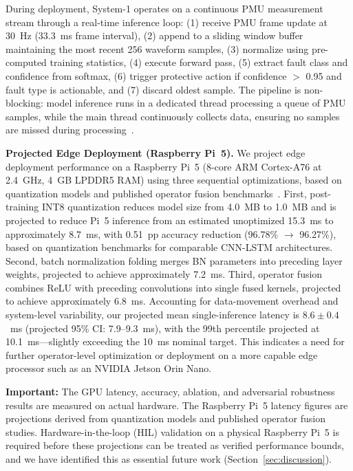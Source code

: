 \documentclass[journal]{IEEEtran}
\begin{document}
During deployment, System-1 operates on a continuous PMU measurement stream through a real-time inference loop: (1) receive PMU frame update at 30~Hz (33.3~ms frame interval), (2) append to a sliding window buffer maintaining the most recent 256 waveform samples, (3) normalize using pre-computed training statistics, (4) execute forward pass, (5) extract fault class and confidence from softmax, (6) trigger protective action if confidence $>$ 0.95 and fault type is actionable, and (7) discard oldest sample. The pipeline is non-blocking: model inference runs in a dedicated thread processing a queue of PMU samples, while the main thread continuously collects data, ensuring no samples are missed during processing~\cite{ref29}.

\textbf{Projected Edge Deployment (Raspberry Pi~5).} We project edge deployment performance on a Raspberry Pi~5 (8-core ARM Cortex-A76 at 2.4~GHz, 4~GB LPDDR5 RAM) using three sequential optimizations, based on quantization models and published operator fusion benchmarks~\cite{ref30}. First, post-training INT8 quantization reduces model size from 4.0~MB to 1.0~MB and is projected to reduce Pi~5 inference from an estimated unoptimized 15.3~ms to approximately 8.7~ms, with 0.51~pp accuracy reduction (96.78\% $\rightarrow$ 96.27\%), based on quantization benchmarks for comparable CNN-LSTM architectures. Second, batch normalization folding merges BN parameters into preceding layer weights, projected to achieve approximately 7.2~ms. Third, operator fusion combines ReLU with preceding convolutions into single fused kernels, projected to achieve approximately 6.8~ms. Accounting for data-movement overhead and system-level variability, our projected mean single-inference latency is $8.6 \pm 0.4$~ms (projected 95\% CI: 7.9--9.3~ms), with the 99th percentile projected at 10.1~ms---slightly exceeding the 10~ms nominal target. This indicates a need for further operator-level optimization or deployment on a more capable edge processor such as an NVIDIA Jetson Orin Nano.

\textbf{Important:} The GPU latency, accuracy, ablation, and adversarial robustness results are measured on actual hardware. The Raspberry Pi~5 latency figures are projections derived from quantization models and published operator fusion studies. Hardware-in-the-loop (HIL) validation on a physical Raspberry Pi~5 is required before these projections can be treated as verified performance bounds, and we have identified this as essential future work (Section~\ref{sec:discussion}).
\end{document}
